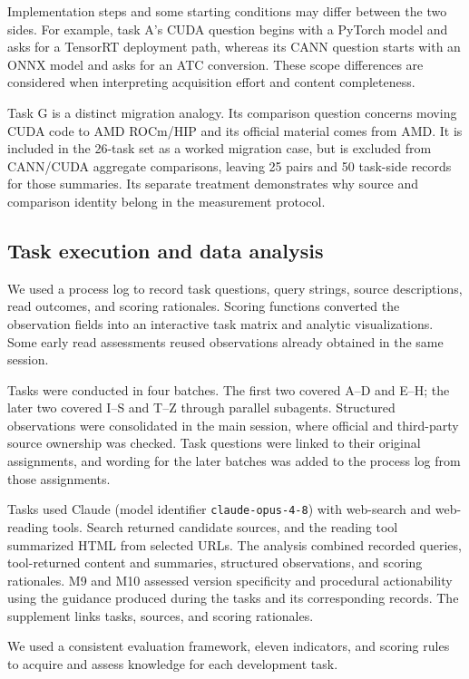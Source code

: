 \documentclass[manuscript,review,anonymous]{acmart}
\begin{document}
Implementation steps and some starting conditions may differ between the two sides. For example, task A's CUDA question begins with a PyTorch model and asks for a TensorRT deployment path, whereas its CANN question starts with an ONNX model and asks for an ATC conversion. These scope differences are considered when interpreting acquisition effort and content completeness.

Task G is a distinct migration analogy. Its comparison question concerns moving CUDA code to AMD ROCm/HIP and its official material comes from AMD. It is included in the 26-task set as a worked migration case, but is excluded from CANN/CUDA aggregate comparisons, leaving 25 pairs and 50 task-side records for those summaries. Its separate treatment demonstrates why source and comparison identity belong in the measurement protocol.

\subsection{Task execution and data analysis}\label{task-execution-and-data-analysis}

We used a process log to record task questions, query strings, source descriptions, read outcomes, and scoring rationales. Scoring functions converted the observation fields into an interactive task matrix and analytic visualizations. Some early read assessments reused observations already obtained in the same session.

Tasks were conducted in four batches. The first two covered A--D and E--H; the later two covered I--S and T--Z through parallel subagents. Structured observations were consolidated in the main session, where official and third-party source ownership was checked. Task questions were linked to their original assignments, and wording for the later batches was added to the process log from those assignments.

Tasks used Claude (model identifier \texttt{claude-opus-4-8}) with web-search and web-reading tools. Search returned candidate sources, and the reading tool summarized HTML from selected URLs. The analysis combined recorded queries, tool-returned content and summaries, structured observations, and scoring rationales. M9 and M10 assessed version specificity and procedural actionability using the guidance produced during the tasks and its corresponding records. The supplement links tasks, sources, and scoring rationales.

We used a consistent evaluation framework, eleven indicators, and scoring rules to acquire and assess knowledge for each development task.
\end{document}
